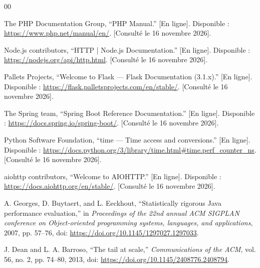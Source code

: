 \documentclass[conference,11pt]{IEEEtran}
\begin{document}
\begin{thebibliography}{00}

The PHP Documentation Group, ``PHP Manual.'' [En ligne]. Disponible :
\url{https://www.php.net/manual/en/}. [Consulté le 16 novembre 2026].

Node.js contributors, ``HTTP | Node.js Documentation.'' [En ligne].
Disponible : \url{https://nodejs.org/api/http.html}.
[Consulté le 16 novembre 2026].

Pallets Projects, ``Welcome to Flask --- Flask Documentation (3.1.x).''
[En ligne]. Disponible : \url{https://flask.palletsprojects.com/en/stable/}.
[Consulté le 16 novembre 2026].

The Spring team, ``Spring Boot Reference Documentation.'' [En ligne].
Disponible :
\url{https://docs.spring.io/spring-boot/}.
[Consulté le 16 novembre 2026].

Python Software Foundation, ``time --- Time access and conversions.''
[En ligne]. Disponible :
\url{https://docs.python.org/3/library/time.html#time.perf_counter_ns}.
[Consulté le 16 novembre 2026].

aiohttp contributors, ``Welcome to AIOHTTP.'' [En ligne]. Disponible :
\url{https://docs.aiohttp.org/en/stable/}.
[Consulté le 16 novembre 2026].

A. Georges, D. Buytaert, and L. Eeckhout, ``Statistically rigorous Java
performance evaluation,'' in \emph{Proceedings of the 22nd annual ACM
SIGPLAN conference on Object-oriented programming systems, languages, and
applications}, 2007, pp. 57--76, doi:
\url{https://doi.org/10.1145/1297027.1297033}.

J. Dean and L. A. Barroso, ``The tail at scale,'' \emph{Communications of
the ACM}, vol. 56, no. 2, pp. 74--80, 2013, doi:
\url{https://doi.org/10.1145/2408776.2408794}.

\end{thebibliography}
\end{document}
